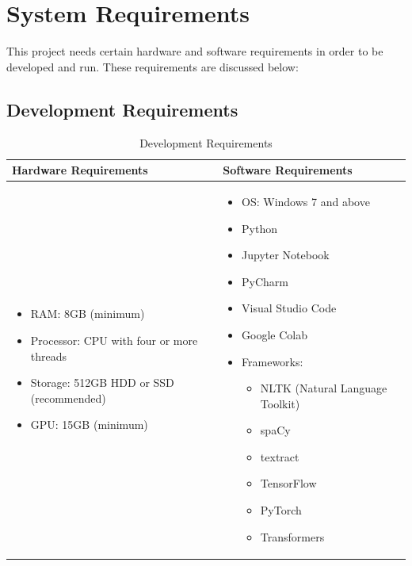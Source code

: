 \section{System Requirements}
This project needs certain hardware and software requirements in order to be developed and run. These requirements are discussed below:
\subsection{Development Requirements}
\begin{table}[h]
\centering
\caption{Development Requirements}
\renewcommand{\arraystretch}{1.5} %
\setlength{\tabcolsep}{8pt} %
\begin{tabular}{|>{\raggedright\arraybackslash}p{6.5cm}|>{\raggedright\arraybackslash}p{6.5cm}|}
\hline
\textbf{Hardware Requirements} & \textbf{Software Requirements} \\
\hline
\begin{itemize}
    \item RAM: 8GB (minimum)
    \item Processor: CPU with four or more threads
    \item Storage: 512GB HDD or SSD (recommended)
    \item GPU: 15GB (minimum)
\end{itemize} & 
\begin{itemize}
    \item OS: Windows 7 and above
    \item Python
    \item Jupyter Notebook
    \item PyCharm
    \item Visual Studio Code
    \item Google Colab
    \item Frameworks:
    \begin{itemize}
        \item NLTK (Natural Language Toolkit)
        \item spaCy
        \item textract
        \item TensorFlow
        \item PyTorch
        \item Transformers
    \end{itemize}
\end{itemize} \\
\hline
\end{tabular}
\label{tab:requirements}
\end{table}

